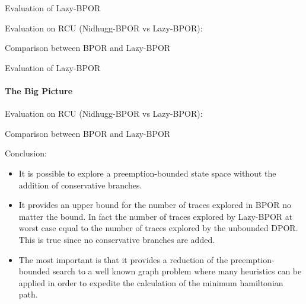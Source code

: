 \documentclass[9pt]{beamer}
\newcommand{\bigtabular}[2]{
 \begin{table} 
   \resizebox{\linewidth}{!}{
      
    }
    \caption{#2}
    \label{#2}
 \end{table}
}
\begin{document}
\iffalse
\begin{frame}{Evaluation of Lazy-BPOR}

Evaluation on RCU (DPOR vs Lazy-BPOR):
\bigtabular{"../tables/lazy_buged_comp.tex"}{Comparison between DPOR and Lazy-BPOR}

\end{frame}
\fi

\begin{frame}{Evaluation of Lazy-BPOR}

Evaluation on RCU (Nidhugg-BPOR vs Lazy-BPOR):
\bigtabular{"../tables/hline_pandas_lazy_preep.tex"}{Comparison between BPOR and Lazy-BPOR}

\end{frame}

\begin{frame}{Evaluation of Lazy-BPOR}
\framesubtitle{The Big Picture}

Evaluation on RCU (Nidhugg-BPOR vs Lazy-BPOR):
\bigtabular{"../tables/hline_pandas_lazy_preep_small.tex"}{Comparison between BPOR and Lazy-BPOR}

\end{frame}

\begin{frame}
Conclusion:

\begin{itemize}[<+->]
    \item It is possible to explore a preemption-bounded state space without the addition of conservative branches.
    \item It provides an upper bound for the number of traces explored in BPOR no matter the bound. In fact the number
    of traces explored by Lazy-BPOR at worst case equal to the number of traces explored by the unbounded DPOR. This is
    true since no conservative branches are added.
    \item The most important is that it provides a reduction of the preemption-bounded search to a well known graph problem where many heuristics can
    be applied in order to expedite the calculation of the minimum hamiltonian path.
\end{itemize}
    
\end{frame}
\end{document}
